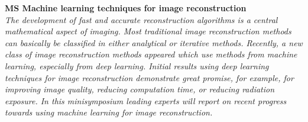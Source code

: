 \begin{multicols}{2}
        \\
        \\\\
        \\
        \\\\
        \\
        \\\\
\\
\end{multicols}
  \noindent\textbf{MS Machine learning techniques for image reconstruction}\\
  \textit{The development of fast and accurate reconstruction algorithms is a central mathematical aspect of imaging. Most traditional image reconstruction methods can basically be classified in either analytical or iterative methods. Recently, a new class of image reconstruction methods appeared which use methods from machine learning, especially from deep learning.  Initial results using deep learning techniques for image reconstruction demonstrate great promise, for example, for improving image quality, reducing computation time, or reducing radiation exposure. In this minisymposium leading experts will report on recent progress towards using machine learning for image reconstruction.} \\
    
